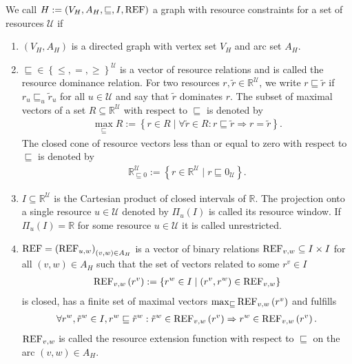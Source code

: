 \begin{definition}
\label{def:graph_resource_constraints}

We call ${H:=\left(V_H,A_H,\sqsubseteq,I,\operatorname{REF}\right)}$ a graph with resource constraints for a set of resources $\mathcal{U}$ if
\begin{enumerate}
	\item{$\left(V_H,A_H\right)$ is a directed graph with vertex set $V_H$ and arc set $A_H$.}
	\item{$\sqsubseteq\in\left\{\leq,=,\geq\right\}^{\mathcal{U}}$ is a vector of resource relations and is called the resource dominance relation.}
		For two resources ${r,\tilde{r}\in\mathbb{R}^{\mathcal{U}}}$, we write ${r\sqsubseteq\tilde{r}}$ if ${r_u\sqsubseteq_u \tilde{r}_u}$ for all $u\in\mathcal{U}$ and say that $\tilde{r}$ dominates $r$. The subset of maximal vectors of a set $R\subseteq\mathbb{R}^{\mathcal{U}}$ with respect to $\sqsubseteq$ is denoted by
		\begin{align*}
			\max_{\sqsubseteq} R := \left\{r\in R\mid \forall\tilde{r}\in R: r\sqsubseteq\tilde{r}\Rightarrow r=\tilde{r}\right\}.
		\end{align*}
		The closed cone of resource vectors less than or equal to zero with respect to $\sqsubseteq$ is denoted by
		\begin{align*}
			\mathbb{R}^{\mathcal{U}}_{\sqsubseteq 0} := \left\{r\in\mathbb{R}^{\mathcal{U}}\mid r\sqsubseteq 0_{\mathcal{U}}\right\}.
		\end{align*}
	\item{$I\subseteq\mathbb{R}^{\mathcal{U}}$ is the Cartesian product of closed intervals of $\mathbb{R}$.}
		The projection onto a single resource $u\in\mathcal{U}$ denoted by $\Pi_u(I)$ is called its resource window. If $\Pi_u(I)=\mathbb{R}$ for some resource $u\in\mathcal{U}$ it is called unrestricted.
	\item{$\operatorname{REF} = \left(\operatorname{REF}_{u,w}\right)_{(v,w)\in A_H}$}
		is a vector of binary relations ${\operatorname{REF}_{v,w}\subseteq I\times I}$ for all ${(v,w)\in A_H}$ such that the set of vectors related to some ${r^v\in I}$
		\begin{align*}
			\operatorname{REF}_{v,w}\left(r^v\right) := \left\{r^w\in I\mid \left(r^v,r^w\right)\in\operatorname{REF}_{v,w}\right\}
		\end{align*}
		is closed, has a finite set of maximal vectors ${\max_{\sqsubseteq}\operatorname{REF}_{v,w}\left(r^v\right)}$ and fulfills
		\begin{align*}
			\forall r^w,\tilde{r}^w\in I,r^w\sqsubseteq\tilde{r}^w : \tilde{r}^w\in\operatorname{REF}_{v,w}\left(r^v\right) \Rightarrow r^w\in\operatorname{REF}_{v,w}\left(r^v\right).
		\end{align*}
		$\operatorname{REF}_{v,w}$ is called the resource extension function with respect to $\sqsubseteq$ on the arc $(v,w)\in A_H$.
\end{enumerate}
	
\end{definition}

